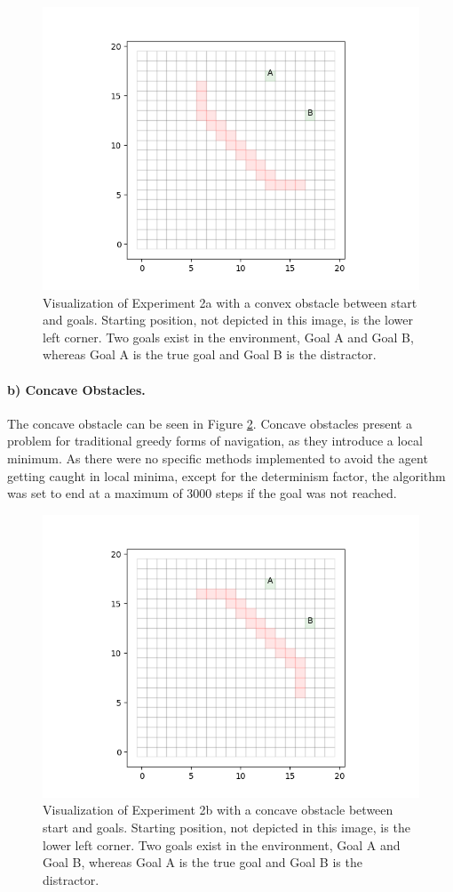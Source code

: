 \begin{figure}
	\centering
	\includegraphics[width=0.8\linewidth]{res/exp2_convex_obstacles}
	\caption{Visualization of Experiment 2a with a convex obstacle between start and goals. Starting position, not depicted in this image, is the lower left corner. Two goals exist in the environment, Goal A and Goal B, whereas Goal A is the true goal and Goal B is the distractor.}
	\label{fig:exp2convexobstacles}
\end{figure}


\paragraph{b) Concave Obstacles.}
The concave obstacle can be seen in Figure \ref{fig:exp2concaveobstacles}.
Concave obstacles present a problem for traditional greedy forms of navigation,
as they introduce a local minimum.
As there were no specific methods implemented to avoid the agent getting caught in local minima, except for the determinism factor, the algorithm was set to end at a maximum of 3000 steps if the goal was not reached.


\begin{figure}
	\centering
	\includegraphics[width=0.8\linewidth]{res/exp2_concave_obstacles}
	\caption{Visualization of Experiment 2b with a concave obstacle between start and goals. Starting position, not depicted in this image, is the lower left corner. Two goals exist in the environment, Goal A and Goal B, whereas Goal A is the true goal and Goal B is the distractor.}
	\label{fig:exp2concaveobstacles}
\end{figure}

